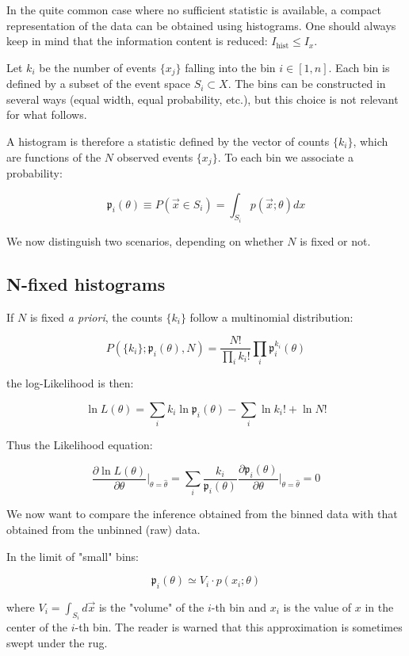 In the quite common case where no sufficient statistic is available, a compact representation of the data can be obtained using histograms. One should always keep in mind that the information content is reduced: $I_{\text{hist}} \leq I_x$.

Let $k_i$ be the number of events $\{x_j\}$ falling into the bin $i \in [1,n]$. Each bin is defined by a subset of the event space $S_i \subset X$. The bins can be constructed in several ways (equal width, equal probability, etc.), but this choice is not relevant for what follows.

A histogram is therefore a statistic defined by the vector of counts $\{k_i\}$, which are functions of the $N$ observed events $\{x_j\}$. To each bin we associate a probability:

	\[
		\mathfrak{p}_i(\theta)\equiv P(\vec{x}\in S_i)=\int_{S_i}p(\vec{x};\theta)dx
	\]

We now distinguish two scenarios, depending on whether $N$ is fixed or not.

\subsection{N-fixed histograms}

If $N$ is fixed \emph{a priori}, the counts $\{k_i\}$ follow a multinomial distribution:

	\[
		P(\{k_i\};\mathfrak{p}_i(\theta),N)=\frac{N!}{\prod_i{k_i!}}\prod_i \mathfrak{p}_i^{k_i}(\theta)
	\]
	
the log-Likelihood is then:

	\[
		\ln L(\theta)=\sum_{i}k_i \ln \mathfrak{p}_i(\theta)-\sum_i\ln k_i! + \ln N!
	\]
	
Thus the Likelihood equation:

	\[
		\frac{\partial\ln L(\theta)}{\partial\theta}\bigg\rvert_{\theta=\hat\theta}=\sum_i \frac{k_i}{\mathfrak{p}_i(\theta)}\frac{\partial\mathfrak{p}_i(\theta)}{\partial\theta}\bigg\rvert_{\theta=\hat\theta}=0
	\]

We now want to compare the inference obtained from the binned data with that obtained from the unbinned (raw) data.

In the limit of "small" bins:

	\[
		\mathfrak{p}_i(\theta)\simeq V_i\cdot p(x_i;\theta)
	\]

where $V_i=\int_{S_i}d\vec{x}$ is the "volume" of the $i$-th bin and $x_i$ is the value of $x$ in the center of the $i$-th bin. The reader is warned that this approximation is sometimes swept under the rug. 

